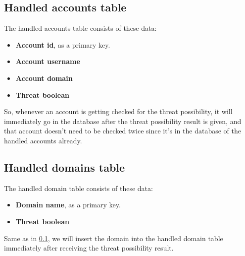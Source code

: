 \subsection{Handled accounts table}\label{ss:hand_acc}
The handled accounts table consists of these data:
\begin{itemize}
	\item \textbf{Account id}, as a primary key.
	\item \textbf{Account username}
	\item \textbf{Account domain}
	\item \textbf{Threat boolean}
\end{itemize}
So, whenever an account is getting checked for the threat possibility, it will immediately go in the database
after the threat possibility result is given, and that account doesn't need to be checked twice since it's in the database
of the handled accounts already.
\subsection{Handled domains table}
The handled domain table consists of these data:
\begin{itemize}
	\item \textbf{Domain name}, as a primary key.
	\item \textbf{Threat boolean}
\end{itemize}
Same as in \ref{ss:hand_acc}, we will insert the domain into the handled domain table immediately after
receiving the threat possibility result.

